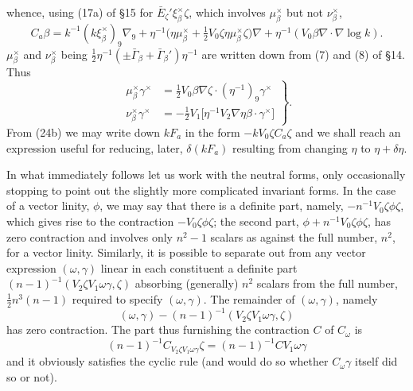 \documentclass[11pt]{article}
\begin{document}
whence, using (17a) of \S15 for $\bar E_\zeta'\xi_\beta^\times\zeta$, which involves $\mu_\beta^\times$ but not $\nu_\beta^\times$,
\begin{equation}C_a\beta=k^{-1}(k\xi_\beta^\times)_9\nabla_9+\eta^{-1}\bigl(\eta\mu_\beta^\times+\tfrac12V_0\zeta\eta\mu_\beta^\times\zeta\bigr)\nabla+\eta^{-1}(V_0\beta\nabla\mathbin{\cdot}\nabla\log k).\tag{24b}\end{equation}
$\mu_\beta^\times$ and $\nu_\beta^\times$ being $\tfrac12\eta^{-1}(\pm\bar\Gamma_\beta+\bar\Gamma_\beta')\eta^{-1}$ are written down from (7) and (8) of \S14. Thus
\begin{equation}
\left.\begin{aligned}
\mu_\beta^\times\gamma^\times&=\tfrac12V_0\beta\nabla\zeta\mathbin{\cdot}(\eta^{-1})_9\gamma^\times\\
\nu_\beta^\times\gamma^\times&=-\tfrac12V_1\bigl[\eta^{-1}V_2\nabla\eta\beta\mathbin{\cdot}\gamma^\times\bigr]
\end{aligned}\right\}.\tag{24c}
\end{equation}
From (24b) we may write down $kF_a$ in the form $-kV_0\zeta C_a\zeta$ and we shall reach an expression useful for reducing, later, $\delta(kF_a)$ resulting from changing $\eta$ to $\eta+\delta\eta$.

\indent In what immediately follows let us work with the neutral forms, only occasionally stopping to point out the slightly more complicated invariant forms. In the case of a vector linity, $\phi$, we may say that there is a definite part, namely, $-n^{-1}V_0\zeta\phi\zeta$, which gives rise to the contraction $-V_0\zeta\phi\zeta$; the second part, $\phi+n^{-1}V_0\zeta\phi\zeta$, has zero contraction and involves only $n^2-1$ scalars as against the full number, $n^2$, for a vector linity. Similarly, it is possible to separate out from any vector expression $(\omega,\gamma)$ linear in each constituent a definite part $(n-1)^{-1}(V_2\zeta V_1\omega\gamma,\zeta)$ absorbing (generally) $n^2$ scalars from the full number, $\tfrac12n^3(n-1)$ required to specify $(\omega,\gamma)$. The remainder of $(\omega,\gamma)$, namely
\[
(\omega,\gamma)-(n-1)^{-1}(V_2\zeta V_1\omega\gamma,\zeta)
\]
has zero contraction. The part thus furnishing the contraction $C$ of $C_\omega$ is
\[
(n-1)^{-1}C_{V_2\zeta V_1\omega\gamma}\zeta=(n-1)^{-1}CV_1\omega\gamma
\]
and it obviously satisfies the cyclic rule (and would do so whether $C_\omega\gamma$ itself did so or not).
\end{document}
